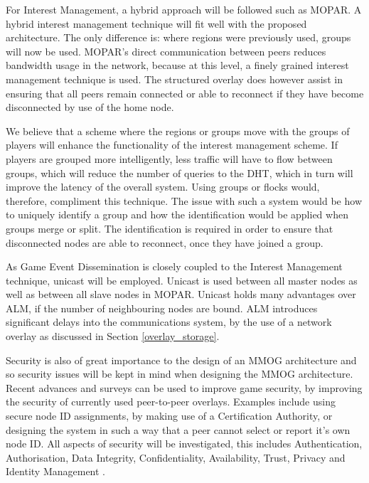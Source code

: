 \documentclass[journal,oneside,a4paper,onecolumn]{IEEEtran}
\begin{document}
For Interest Management, a hybrid approach will be followed such as MOPAR. A hybrid interest management technique will fit well with the proposed architecture. The only difference is: where regions were previously used, groups will now be used. MOPAR's direct communication between peers reduces bandwidth usage in the network, because at this level, a finely grained interest management technique is used. The structured overlay does however assist in ensuring that all peers remain connected or able to reconnect if they have become disconnected by use of the home node.

We believe that a scheme where the regions or groups move with the groups of players will enhance the functionality of the interest management scheme. If players are grouped more intelligently, less traffic will have to flow between groups, which will reduce the number of queries to the DHT, which in turn will improve the latency of the overall system. Using groups or flocks would, therefore, compliment this technique. The issue with such a system would be how to uniquely identify a group and how the identification would be applied when groups merge or split. The identification is required in order to ensure that disconnected nodes are able to reconnect, once they have joined a group.

As Game Event Dissemination is closely coupled to the Interest Management technique, unicast will be employed. Unicast is used between all master nodes as well as between all slave nodes in MOPAR. Unicast holds many advantages over ALM, if the number of neighbouring nodes are bound. ALM introduces significant delays into the communications system, by the use of a network overlay as discussed in Section \ref{overlay_storage}.

Security is also of great importance to the design of an MMOG architecture and so security issues will be kept in mind when designing the MMOG architecture. Recent advances and surveys can be used to improve game security, by improving the security of currently used peer-to-peer overlays. Examples include using secure node ID assignments, by making use of a Certification Authority, or designing the system in such a way that a peer cannot select or report it's own node ID. All aspects of security will be investigated, this includes Authentication, Authorisation, Data Integrity, Confidentiality, Availability, Trust, Privacy and Identity Management \cite{distributed_systems_security}.
\end{document}
